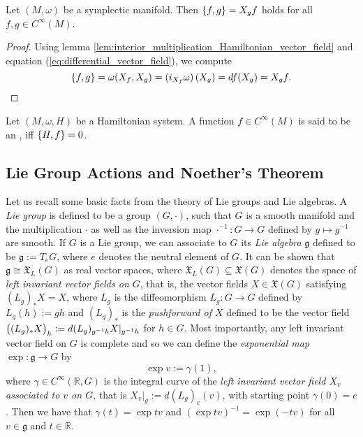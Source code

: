 \begin{lemma}
	\label{lem:Poisson_bracket_equivalent}
	Let $(M,\omega)$ be a symplectic manifold. Then $\cbr{f,g} = X_gf$ holds for all $f,g \in C^\infty(M)$.
\end{lemma}

\begin{proof}
	Using lemma \ref{lem:interior_multiplication_Hamiltonian_vector_field} and equation (\ref{eq:differential_vector_field}), we compute
	\begin{equation*}
		\cbr{f,g} = \omega(X_f,X_g) = \del[0]{i_{X_f}\omega}(X_g) = df(X_g) = X_g f.
	\end{equation*}
\end{proof}

\begin{definition}
	Let $(M,\omega,H)$ be a Hamiltonian system. A function $f \in C^\infty(M)$ is said to be an , iff $\cbr{H,f} = 0$.
\end{definition}

\subsection*{Lie Group Actions and Noether's Theorem}
Let us recall some basic facts from the theory of Lie groups and Lie algebras. A \emph{Lie group} is defined to be a group $(G,\cdot)$, such that $G$ is a smooth manifold and the multiplication $\cdot$ as well as the inversion map $\cdot^{-1} : G \to G$ defined by $g\mapsto g^{-1}$ are smooth. If $G$ is a Lie group, we can associate to $G$ its \emph{Lie algebra} $\mathfrak{g}$ defined to be $\mathfrak{g} := T_eG$, where $e$ denotes the neutral element of $G$. It can be shown that $\mathfrak{g} \cong \mathfrak{X}_L(G)$ as real vector spaces, where $\mathfrak{X}_L(G) \subseteq \mathfrak{X}(G)$ denotes the space of \emph{left invariant vector fields on $G$}, that is, the vector fields $X \in \mathfrak{X}(G)$ satisfying $(L_g)_* X = X$, where $L_g$ is the diffeomorphism $L_g : G \to G$ defined by $L_g(h) := gh$ and $(L_g)_*$ is the \emph{pushforward of $X$} defined to be the vector field $\del[1]{(L_g)_*X}_h := d(L_g)_{g^{-1}h}X\vert_{g^{-1}h}$ for $h \in G$. Most importantly, any left invariant vector field on $G$ is complete and so we can define the \emph{exponential map} $\exp : \mathfrak{g} \to G$ by 
\begin{equation*}
	\exp v := \gamma(1),
\end{equation*}
\noindent where $\gamma \in C^\infty(\mathbb{R},G)$ is the integral curve of the \emph{left invariant vector field $X_v$ associated to $v$ on $G$}, that is $X_v\vert_g := d(L_g)_e(v)$, with starting point $\gamma(0) = e$. Then we have that $\gamma(t) = \exp tv$ and $(\exp tv)^{-1} = \exp (-tv)$ for all $v \in \mathfrak{g}$ and $t \in \mathbb{R}$.

